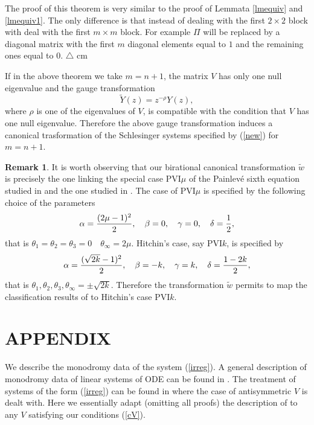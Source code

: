 \documentclass[12pt]{article}
\theoremstyle{definition}
\newtheorem{rmk}[df]{Remark}
\theoremstyle{theorem}
\begin{document}
 The proof of this theorem is very similar to the 
proof of Lemmata \ref{lmequiv} and \ref{lmequiv1}. The only difference is that 
instead of dealing with the first $2\times 2$ block with deal with the first 
$m\times m$ block. For example $\Pi$ will be replaced by a diagonal matrix 
with the first $m$ diagonal elements equal to $1$ and the remaining ones equal 
to $0$. {\hfill $\bigtriangleup$}
 cm

If in the above theorem we take $m=n+1$, the matrix $V$ has only one null
eigenvalue and the gauge transformation
$$
\tilde Y(z)=z^{-\rho} Y(z),
$$
where $\rho$ is one of the eigenvalues of $V$, is compatible 
with the condition that $V$ has one null eigenvalue. Therefore the above gauge
transformation induces a canonical trasformation of the Schlesinger systems
specified by (\ref{new}) for $m=n+1$.


\begin{rmk}
It is worth observing that our birational canonical transformation $\tilde w$ 
is precisely the one linking the special case PVI$\mu$ of the Painlev\'e
sixth equation studied in \cite{DM,M} and the one studied in \cite{Hit, Hit3}.
The case of PVI$\mu$ is specified by the following choice of the parameters
$$
\alpha={(2\mu-1)^2\over2},\quad\beta=0,\quad\gamma=0,\quad\delta={1\over2},
$$
that is $\theta_1=\theta_2=\theta_3=0 \quad\theta_\infty=2\mu$. Hitchin's case,
say PVI$k$, is specified by 
$$
\alpha={(\sqrt{2 k}-1)^2\over2},\quad\beta=-k,
\quad\gamma=k,\quad\delta={1-2k\over2},
$$ 
that is $\theta_1,\theta_2,\theta_3,\theta_\infty=\pm\sqrt{2 k}$.
Therefore the transformation $\tilde w$ permits to map the classification 
results of \cite{DM,M} to Hitchin's case PVI$k$.
\end{rmk}



\renewcommand{\theequation}{A-\arabic{equation}}
  \setcounter{equation}{0}  %
  \section*{APPENDIX}  %

We describe the monodromy data of the system (\ref{irreg}). A general 
description of monodromy data of linear systems of ODE can be
found in \cite{MJ1,Mj2,MJU}. The treatment of systems of the form
(\ref{irreg}) can be found in \cite{Dub7} where the case of antisymmetric 
$V$ is dealt with. Here we essentially adapt (omitting all proofs) the 
description of \cite{Dub7} to any $V$ satisfying our conditions (\ref{cV}). 
\end{document}
